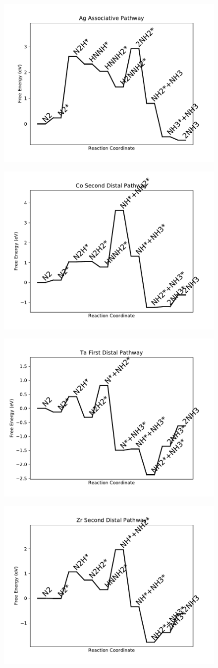 \documentclass[journal=jacsat,manuscript=article]{achemso}
\begin{document}
\begin{figure}
\includegraphics[width=0.5\linewidth]{data/plots/Ag_associative.pdf}
\label{fig:Ag_associative}
\end{figure}

\newpage
\begin{figure}
\includegraphics[width=0.5\linewidth]{data/plots/Co_distal_2.pdf}
\label{fig:Co_distal_2}
\end{figure}

\begin{figure}
\includegraphics[width=0.5\linewidth]{data/plots/Ta_distal_1.pdf}
\label{fig:Ta_distal_1}
\end{figure}

\newpage
\begin{figure}
\includegraphics[width=0.5\linewidth]{data/plots/Zr_distal_2.pdf}
\label{fig:Zr_distal_2}
\end{figure}
\end{document}
